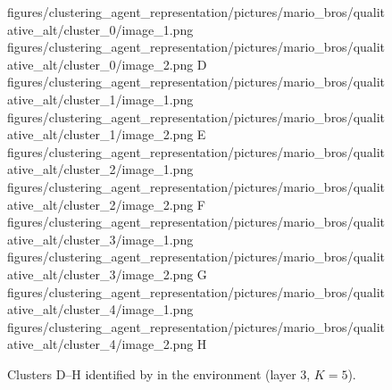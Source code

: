 \begin{figure}[H]
    \qualitativeClusterFigureSetup
    \qualitativeClusterTwo
        {figures/clustering_agent_representation/pictures/mario_bros/qualitative_alt/cluster_0/image_1.png}
        {figures/clustering_agent_representation/pictures/mario_bros/qualitative_alt/cluster_0/image_2.png}
        {D}
    \qualitativeClusterTwo
        {figures/clustering_agent_representation/pictures/mario_bros/qualitative_alt/cluster_1/image_1.png}
        {figures/clustering_agent_representation/pictures/mario_bros/qualitative_alt/cluster_1/image_2.png}
        {E}
    \qualitativeClusterTwo
        {figures/clustering_agent_representation/pictures/mario_bros/qualitative_alt/cluster_2/image_1.png}
        {figures/clustering_agent_representation/pictures/mario_bros/qualitative_alt/cluster_2/image_2.png}
        {F}
    \qualitativeClusterTwo
        {figures/clustering_agent_representation/pictures/mario_bros/qualitative_alt/cluster_3/image_1.png}
        {figures/clustering_agent_representation/pictures/mario_bros/qualitative_alt/cluster_3/image_2.png}
        {G}
    \qualitativeClusterTwo
        {figures/clustering_agent_representation/pictures/mario_bros/qualitative_alt/cluster_4/image_1.png}
        {figures/clustering_agent_representation/pictures/mario_bros/qualitative_alt/cluster_4/image_2.png}
        {H}
    \caption{Clusters D--H identified by  in the \MarioBrosName environment (layer 3, $K=5$).}
    \label{fig:qualitative_mario_bros_alt}
\end{figure}
